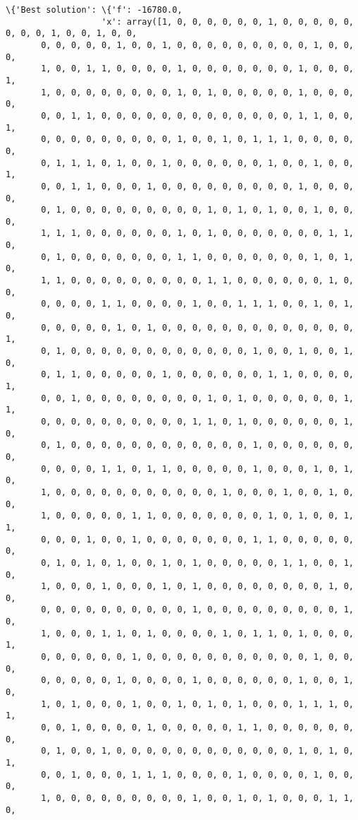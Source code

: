 \documentclass[11pt]{article}
\begin{document}
    \begin{Verbatim}[commandchars=\\\{\}]
\{'Best solution': \{'f': -16780.0,
                   'x': array([1, 0, 0, 0, 0, 0, 0, 1, 0, 0, 0, 0, 0, 0, 0, 0, 1, 0, 0, 1, 0, 0,
       0, 0, 0, 0, 0, 1, 0, 0, 1, 0, 0, 0, 0, 0, 0, 0, 0, 0, 1, 0, 0, 0,
       1, 0, 0, 1, 1, 0, 0, 0, 0, 1, 0, 0, 0, 0, 0, 0, 0, 1, 0, 0, 0, 1,
       1, 0, 0, 0, 0, 0, 0, 0, 0, 1, 0, 1, 0, 0, 0, 0, 0, 1, 0, 0, 0, 0,
       0, 0, 1, 1, 0, 0, 0, 0, 0, 0, 0, 0, 0, 0, 0, 0, 0, 1, 1, 0, 0, 1,
       0, 0, 0, 0, 0, 0, 0, 0, 0, 1, 0, 0, 1, 0, 1, 1, 1, 0, 0, 0, 0, 0,
       0, 1, 1, 1, 0, 1, 0, 0, 1, 0, 0, 0, 0, 0, 0, 1, 0, 0, 1, 0, 0, 1,
       0, 0, 1, 1, 0, 0, 0, 1, 0, 0, 0, 0, 0, 0, 0, 0, 0, 1, 0, 0, 0, 0,
       0, 1, 0, 0, 0, 0, 0, 0, 0, 0, 0, 1, 0, 1, 0, 1, 0, 0, 1, 0, 0, 0,
       1, 1, 1, 0, 0, 0, 0, 0, 0, 1, 0, 1, 0, 0, 0, 0, 0, 0, 0, 1, 1, 0,
       0, 1, 0, 0, 0, 0, 0, 0, 0, 1, 1, 0, 0, 0, 0, 0, 0, 0, 1, 0, 1, 0,
       1, 1, 0, 0, 0, 0, 0, 0, 0, 0, 0, 1, 1, 0, 0, 0, 0, 0, 0, 1, 0, 0,
       0, 0, 0, 0, 1, 1, 0, 0, 0, 0, 1, 0, 0, 1, 1, 1, 0, 0, 1, 0, 1, 0,
       0, 0, 0, 0, 0, 1, 0, 1, 0, 0, 0, 0, 0, 0, 0, 0, 0, 0, 0, 0, 0, 1,
       0, 1, 0, 0, 0, 0, 0, 0, 0, 0, 0, 0, 0, 0, 1, 0, 0, 1, 0, 0, 1, 0,
       0, 1, 1, 0, 0, 0, 0, 0, 1, 0, 0, 0, 0, 0, 0, 1, 1, 0, 0, 0, 0, 1,
       0, 0, 1, 0, 0, 0, 0, 0, 0, 0, 0, 1, 0, 1, 0, 0, 0, 0, 0, 0, 1, 1,
       0, 0, 0, 0, 0, 0, 0, 0, 0, 0, 1, 1, 0, 1, 0, 0, 0, 0, 0, 0, 1, 0,
       0, 1, 0, 0, 0, 0, 0, 0, 0, 0, 0, 0, 0, 0, 1, 0, 0, 0, 0, 0, 0, 0,
       0, 0, 0, 0, 1, 1, 0, 1, 1, 0, 0, 0, 0, 0, 1, 0, 0, 0, 1, 0, 1, 0,
       1, 0, 0, 0, 0, 0, 0, 0, 0, 0, 0, 0, 1, 0, 0, 0, 1, 0, 0, 1, 0, 0,
       1, 0, 0, 0, 0, 0, 1, 1, 0, 0, 0, 0, 0, 0, 0, 1, 0, 1, 0, 0, 1, 1,
       0, 0, 0, 1, 0, 0, 1, 0, 0, 0, 0, 0, 0, 0, 1, 1, 0, 0, 0, 0, 0, 0,
       0, 1, 0, 1, 0, 1, 0, 0, 1, 0, 1, 0, 0, 0, 0, 0, 1, 1, 0, 0, 1, 0,
       1, 0, 0, 0, 1, 0, 0, 0, 1, 0, 1, 0, 0, 0, 0, 0, 0, 0, 0, 1, 0, 0,
       0, 0, 0, 0, 0, 0, 0, 0, 0, 0, 1, 0, 0, 0, 0, 0, 0, 0, 0, 0, 1, 0,
       1, 0, 0, 0, 1, 1, 0, 1, 0, 0, 0, 0, 1, 0, 1, 1, 0, 1, 0, 0, 0, 1,
       0, 0, 0, 0, 0, 0, 1, 0, 0, 0, 0, 0, 0, 0, 0, 0, 0, 0, 1, 0, 0, 0,
       0, 0, 0, 0, 0, 1, 0, 0, 0, 0, 1, 0, 0, 0, 0, 0, 0, 1, 0, 0, 1, 0,
       1, 0, 1, 0, 0, 0, 1, 0, 0, 1, 0, 1, 0, 1, 0, 0, 0, 1, 1, 1, 0, 1,
       0, 0, 1, 0, 0, 0, 0, 1, 0, 0, 0, 0, 0, 1, 1, 0, 0, 0, 0, 0, 0, 0,
       0, 1, 0, 0, 1, 0, 0, 0, 0, 0, 0, 0, 0, 0, 0, 0, 0, 1, 0, 1, 0, 1,
       0, 0, 1, 0, 0, 0, 1, 1, 1, 0, 0, 0, 0, 1, 0, 0, 0, 0, 1, 0, 0, 0,
       1, 0, 0, 0, 0, 0, 0, 0, 0, 0, 1, 0, 0, 1, 0, 1, 0, 0, 0, 1, 1, 0,

\end{Verbatim}
\end{document}
